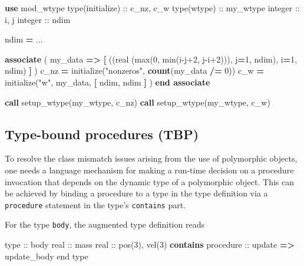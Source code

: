 \documentclass[
  paper=a4,
  ,captions=tableheading
]{scrartcl}
\newenvironment{Shaded}{\begin{snugshade}}{\end{snugshade}}
\newcommand{\DataTypeTok}[1]{\textcolor[rgb]{0.13,0.29,0.53}{#1}}
\newcommand{\DecValTok}[1]{\textcolor[rgb]{0.00,0.00,0.81}{#1}}
\newcommand{\FunctionTok}[1]{\textcolor[rgb]{0.13,0.29,0.53}{\textbf{#1}}}
\newcommand{\KeywordTok}[1]{\textcolor[rgb]{0.13,0.29,0.53}{\textbf{#1}}}
\newcommand{\NormalTok}[1]{#1}
\newcommand{\OperatorTok}[1]{\textcolor[rgb]{0.81,0.36,0.00}{\textbf{#1}}}
\newcommand{\StringTok}[1]{\textcolor[rgb]{0.31,0.60,0.02}{#1}}
\begin{document}
\begin{Shaded}
\begin{Highlighting}[]
\KeywordTok{use}\NormalTok{ mod\_wtype}
\DataTypeTok{type(initialize)} \DataTypeTok{::}\NormalTok{ c\_nz, c\_w}
\DataTypeTok{type(wtype)} \DataTypeTok{::}\NormalTok{ my\_wtype}
\DataTypeTok{integer} \DataTypeTok{::}\NormalTok{ i, j}
\DataTypeTok{integer} \DataTypeTok{::}\NormalTok{ ndim}

\NormalTok{ndim }\KeywordTok{=}\NormalTok{ ...}

\KeywordTok{associate}\NormalTok{ ( my\_data }\KeywordTok{=}\OperatorTok{\textgreater{}} \KeywordTok{[}\NormalTok{ ((}\DataTypeTok{real (max(0, min(i{-}j+2, j{-}i+2)))}\NormalTok{, j}\KeywordTok{=}\DecValTok{1}\NormalTok{, ndim), i}\KeywordTok{=}\DecValTok{1}\NormalTok{, ndim) }\KeywordTok{]}\NormalTok{ )}
\NormalTok{  c\_nz }\KeywordTok{=}\NormalTok{ initialize(}\StringTok{"nonzeros"}\NormalTok{, }\FunctionTok{count}\NormalTok{(my\_data }\OperatorTok{/=} \DecValTok{0}\NormalTok{))}
\NormalTok{  c\_w }\KeywordTok{=}\NormalTok{ initialize(}\StringTok{"w"}\NormalTok{, my\_data, }\KeywordTok{[}\NormalTok{ ndim, ndim }\KeywordTok{]}\NormalTok{ )}
\KeywordTok{end associate}

\KeywordTok{call}\NormalTok{ setup\_wtype(my\_wtype, c\_nz)}
\KeywordTok{call}\NormalTok{ setup\_wtype(my\_wtype, c\_w)}
\end{Highlighting}
\end{Shaded}

\subsection{Type-bound procedures (TBP)}\label{sec:tbp}

To resolve the class mismatch issues arising from the use of polymorphic
objects, one needs a language mechanism for making a run-time decision
on a procedure invocation that depends on the dynamic type of a
polymorphic object. This can be achieved by binding a procedure to a
type in the type definition via a \texttt{procedure} statement in the
type's \texttt{contains} part.

For the type \texttt{body}, the augmented type definition reads

\begin{Shaded}
\begin{Highlighting}[]
\DataTypeTok{type} \DataTypeTok{::}\NormalTok{ body}
  \DataTypeTok{real} \DataTypeTok{::}\NormalTok{ mass}
  \DataTypeTok{real} \DataTypeTok{::}\NormalTok{ pos(}\DecValTok{3}\NormalTok{), vel(}\DecValTok{3}\NormalTok{)}
\KeywordTok{contains}
  \DataTypeTok{procedure} \DataTypeTok{::}\NormalTok{ update }\KeywordTok{=}\OperatorTok{\textgreater{}}\NormalTok{ update\_body}
\DataTypeTok{end type}
\end{Highlighting}
\end{Shaded}
\end{document}
